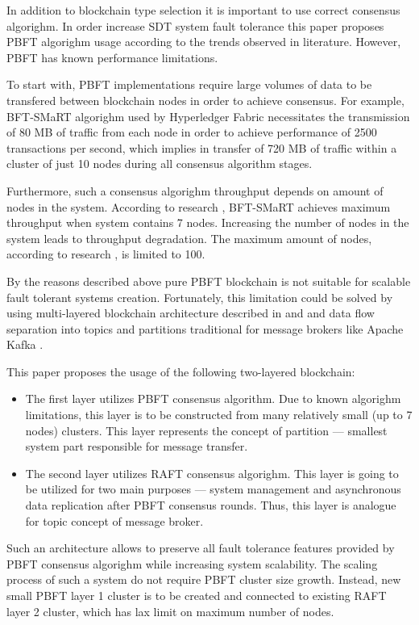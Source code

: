 \documentclass[10pt]{llncs}
\begin{document}
In addition to blockchain type selection it is important to use correct consensus algorighm.
In order increase SDT system fault tolerance this paper proposes PBFT algorighm usage according to the trends observed in literature.
However, PBFT has known performance limitations.

To start with, PBFT implementations require large volumes of data to be transfered between blockchain nodes in order to achieve consensus.
For example, BFT-SMaRT algorighm used by Hyperledger Fabric \cite{barger2021byzantine} necessitates the transmission of 80 MB of traffic from each node 
in order to achieve performance of 2500 transactions per second, which implies in transfer of 720 MB of traffic within a cluster of just 10 nodes during all consensus algorithm stages.

Furthermore, such a consensus algorighm throughput depends on amount of nodes in the system.
According to research \cite{barger2021byzantine}, BFT-SMaRT achieves maximum throughput when system contains 7 nodes.
Increasing the number of nodes in the system leads to throughput degradation.
The maximum amount of nodes, according to research \cite{Ke2023}, is limited to 100.

By the reasons described above pure PBFT blockchain is not suitable for scalable fault tolerant systems creation.
Fortunately, this limitation could be solved by using multi-layered blockchain architecture described in \cite{Bogdanov2024} and \cite{Lin2023} and 
data flow separation into topics and partitions traditional for message brokers like Apache Kafka \cite{apachekafka}.

This paper proposes the usage of the following two-layered blockchain:
\begin{itemize}
    \item The first layer utilizes PBFT consensus algorithm.
    Due to known algorighm limitations, this layer is to be constructed from many relatively small (up to 7 nodes) clusters.
    This layer represents the concept of partition --- smallest system part responsible for message transfer.
    \item The second layer utilizes RAFT \cite{ongaro2015raft} consensus algorighm.
    This layer is going to be utilized for two main purposes --- system management and asynchronous data replication after PBFT consensus rounds.
    Thus, this layer is analogue for topic concept of message broker.
\end{itemize}

Such an architecture allows to preserve all fault tolerance features provided by PBFT consensus algorighm while increasing system scalability.
The scaling process of such a system do not require PBFT cluster size growth. 
Instead, new small PBFT layer 1 cluster is to be created and connected to existing RAFT layer 2 cluster, which has lax limit on maximum number of nodes.
\end{document}

